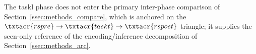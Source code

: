 %
%
%



    The \acrshort{taskl} phase does not enter the primary inter-phase comparison of Section~\ref{ssec:methods_compare}, which is anchored on the \(\txtacr{rspre} \to \txtacr{taskt} \to \txtacr{rspost}\) triangle; it supplies the seen-only reference of the encoding/inference decomposition of Section~\ref{ssec:methods_arc}.

